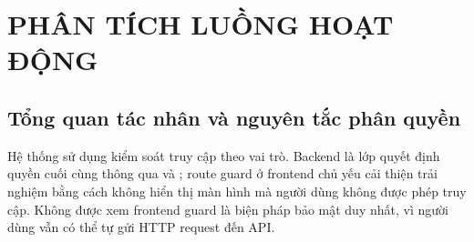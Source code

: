 \chapter{PHÂN TÍCH LUỒNG HOẠT ĐỘNG}
\label{chap:flows}

\section{Tổng quan tác nhân và nguyên tắc phân quyền}

Hệ thống sử dụng kiểm soát truy cập theo vai trò. Backend là lớp quyết định quyền cuối cùng thông qua  và ; route guard ở frontend chủ yếu cải thiện trải nghiệm bằng cách không hiển thị màn hình mà người dùng không được phép truy cập. Không được xem frontend guard là biện pháp bảo mật duy nhất, vì người dùng vẫn có thể tự gửi HTTP request đến API.


